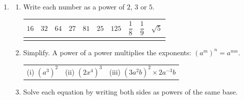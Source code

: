 \documentclass[12pt, twoside]{article}
\begin{document}
\begin{enumerate}[itemsep=0.15cm]
\begin{enumerate}[itemsep=0.15cm]
  \item Expand the left side. Collect it into a rational part and a
  $\sqrt{2}$ part. \vfill
  \item The rational parts on the two sides are equal, and the
  $\sqrt{2}$ parts are equal. Write two equations in $a$ and $b$, and
  solve them. \vfill
\end{enumerate}

\newpage

\item[5.]
\begin{enumerate}[itemsep=0.15cm]
  \item Write each number as a power of $2$, $3$ or $5$.

  \smallskip
  {\renewcommand{\arraystretch}{1.8}
  \begin{tabular}{|c|c|c|c|c|c|c|c|c|c|}
  \hline
  $16$ & $32$ & $64$ & $27$ & $81$ & $25$ & $125$ & $\dfrac{1}{8}$ & $\dfrac{1}{9}$ & $\sqrt{5}$ \\
  \hline
  \hspace{0.9cm} & \hspace{0.9cm} & \hspace{0.9cm} & \hspace{0.9cm} & \hspace{0.9cm} & \hspace{0.9cm} & \hspace{0.9cm} & \hspace{0.9cm} & \hspace{0.9cm} & \hspace{0.9cm} \\[0.4cm]
  \hline
  \end{tabular}}

  \item Simplify. A power of a power multiplies the exponents:
  $\left(a^{m}\right)^{n} = a^{mn}$.

  \begin{tabular}{@{}p{}p{}p{}}
  (i) $\left(a^{3}\right)^{2}$ & (ii) $\left(2x^{4}\right)^{3}$ &
  (iii) $\left(3a^{2}b\right)^{2} \times 2a^{-3}b$
  \end{tabular}
  \vfill
  \item Solve each equation by writing both sides as powers of the same
  base.


\end{enumerate}
\end{enumerate}
\end{document}
